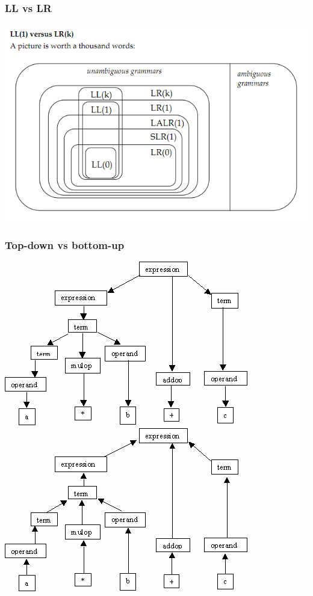 \documentclass{beamer}
\begin{document}
\begin{frame}
  \frametitle{LL vs LR}
  \begin{center}
    \includegraphics[scale=0.47]{LLLR}
  \end{center}
\end{frame}

\begin{frame}
  \frametitle{Top-down vs bottom-up}
  \begin{center}
    \includegraphics[scale=0.3]{topdown}
\hfill
    \includegraphics[scale=0.3]{bottomup}
  \end{center}
\end{frame}
\end{document}

